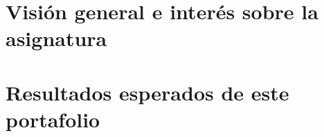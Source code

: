 \documentclass[../portafolio.tex]{subfiles}
\begin{document}
\section*{Visión general e interés sobre la asignatura}


\section*{Resultados esperados de este portafolio}
\end{document}
